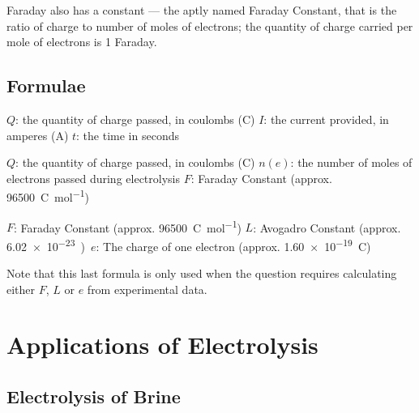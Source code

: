			Faraday also has a constant --- the aptly named Faraday Constant, that is the ratio of charge to number of moles of electrons; the
			quantity of charge carried per mole of electrons is 1 Faraday.



		\subsection{Formulae}

			\mathdiagram{
				\[ Q = I \times t \]
			}

			\tabto{0mm}$Q$:     \tabto{10mm}the quantity of charge passed, in coulombs (\si{\coulomb})
			\tabto{0mm}$I$:     \tabto{10mm}the current provided, in amperes (\si{\ampere})
			\tabto{0mm}$t$:     \tabto{10mm}the time in seconds

			\vspace{1em}


			\mathdiagram{
				\[ Q = n(e) \times F \]
			}

			\tabto{0mm}$Q$:     \tabto{10mm}the quantity of charge passed, in coulombs (\si{\coulomb})
			\tabto{0mm}$n(e)$:  \tabto{10mm}the number of moles of electrons passed during electrolysis
			\tabto{0mm}$F$:     \tabto{10mm}Faraday Constant (approx. \SI{96500}{\coulomb\per\mole})

			\vspace{1em}


			\mathdiagram{
				\[ F = L \times e \]
			}

			\tabto{0mm}$F$:     \tabto{10mm}Faraday Constant (approx. \SI{96500}{\coulomb\per\mole})
			\tabto{0mm}$L$:     \tabto{10mm}Avogadro Constant (approx. \SI{6.02e-23})
			\tabto{0mm}$e$:     \tabto{10mm}The charge of one electron (approx. \SI{1.60e-19}{\coulomb})


			Note that this last formula is only used when the question requires calculating either $F$, $L$ or $e$ from experimental data.







	\pagebreak
	\section{Applications of Electrolysis}

		\subsection{Electrolysis of Brine}

